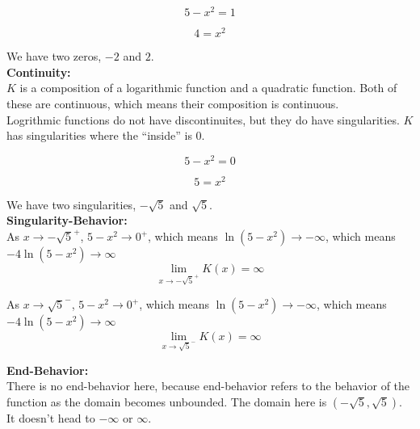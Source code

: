 \documentclass{ximera}
\begin{document}
\[
5 - x^2 = 1
\]


\[
4 = x^2
\]


We have two zeros, $-2$ and $2$. \\




\textbf{\textcolor{blue!55!black}{Continuity:}} \\


$K$ is a composition of a logarithmic function and a quadratic function.  Both of these are continuous, which means their composition is continuous. \\

Logrithmic functions do not have discontinuites, but they do have singularities.  $K$ has singularities where the ``inside'' is $0$.


\[
5 - x^2 = 0
\]


\[
5 = x^2
\]



We have two singularities, $-\sqrt{5}$ and $\sqrt{5}$. \\




\textbf{\textcolor{blue!55!black}{Singularity-Behavior:}} \\



As $x \to -\sqrt{5}^+$, $5 - x^2 \to 0^+$, which means $\ln(5 - x^2) \to -\infty$, which means  $-4 \ln(5 - x^2) \to \infty$\\

\[
\lim\limits_{x \to -\sqrt{5}^+} K(x) = \infty
\]




As $x \to \sqrt{5}^-$, $5 - x^2 \to 0^+$, which means $\ln(5 - x^2) \to -\infty$, which means  $-4 \ln(5 - x^2) \to \infty$\\

\[
\lim\limits_{x \to \sqrt{5}^-} K(x) = \infty
\]
















\textbf{\textcolor{blue!55!black}{End-Behavior:}} \\

There is no end-behavior here, because end-behavior refers to the behavior of the function as the domain becomes unbounded.  The domain here is $(-\sqrt{5}, \sqrt{5})$. It doesn't head to $-\infty$ or $\infty$.
\end{document}
